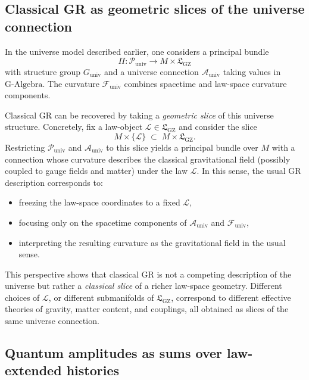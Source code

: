 \documentclass[11pt]{book}
\newcommand{\GAlgebra}{\text{G-Algebra}}
\newcommand{\GZLS}{\ensuremath{\mathfrak{L}_{\mathrm{GZ}}}}
\newcommand{\Base}{\ensuremath{M}}
\theoremstyle{plain}
\theoremstyle{definition}
\theoremstyle{remark}
\begin{document}
\subsection{Classical GR as geometric slices of the universe connection}
\label{subsec:gr-as-slices}


In the universe model described earlier, one considers a principal
bundle
\[
   \Pi \colon \mathcal{P}_{\mathrm{univ}} \longrightarrow
   \Base \times \GZLS
\]
with structure group $G_{\mathrm{univ}}$ and a universe connection
$\mathcal{A}_{\mathrm{univ}}$ taking values in $\GAlgebra$. The
curvature $\mathcal{F}_{\mathrm{univ}}$ combines spacetime and
law-space curvature components.

Classical GR can be recovered by taking a \emph{geometric slice} of
this universe structure. Concretely, fix a law-object
$\mathcal{L} \in \GZLS$ and consider the slice
\[
   \Base \times \{\mathcal{L}\} \;\subset\; \Base \times \GZLS.
\]
Restricting $\mathcal{P}_{\mathrm{univ}}$ and
$\mathcal{A}_{\mathrm{univ}}$ to this slice yields a principal
bundle over $\Base$ with a connection whose curvature describes the
classical gravitational field (possibly coupled to gauge fields and
matter) under the law $\mathcal{L}$. In this sense, the usual GR
description corresponds to:

\begin{itemize}
  \item freezing the law-space coordinates to a fixed
        $\mathcal{L}$,
  \item focusing only on the spacetime components of
        $\mathcal{A}_{\mathrm{univ}}$ and $\mathcal{F}_{\mathrm{univ}}$,
  \item interpreting the resulting curvature as the gravitational
        field in the usual sense.
\end{itemize}

This perspective shows that classical GR is not a competing
description of the universe but rather a \emph{classical slice} of
a richer law-space geometry. Different choices of $\mathcal{L}$, or
different submanifolds of $\GZLS$, correspond to different
effective theories of gravity, matter content, and couplings, all
obtained as slices of the same universe connection.

\subsection{Quantum amplitudes as sums over law-extended histories}
\label{subsec:law-extended-histories}
\end{document}
